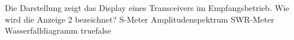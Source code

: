     {Die Darstellung zeigt das Display eines Transceivers im Empfangsbetrieb. Wie wird die Anzeige 2 bezeichnet?}
    {S-Meter}
    {Amplitudenspektrum}
    {SWR-Meter}
    {Wasserfalldiagramm}
    {true}{false}